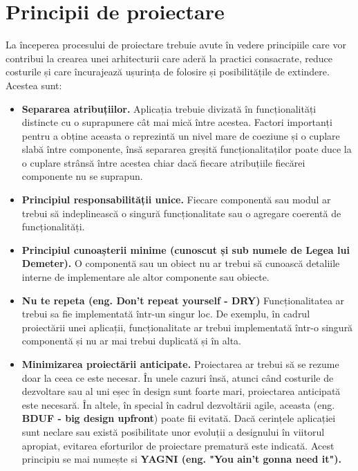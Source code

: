 \documentclass[12pt, a4paper, oneside, romanian]{teza-upb}
\begin{document}
\section{Principii de proiectare}
La începerea procesului de proiectare trebuie avute în vedere principiile care vor contribui la crearea unei arhitecturii care aderă la practici consacrate, reduce costurile și care încurajează ușurința de folosire și posibilitățile de extindere. Acestea sunt:
\begin{itemize}
\item \textbf{Separarea atribuțiilor.} Aplicația trebuie divizată în funcționalități distincte cu o suprapunere cât mai mică între acestea. Factori importanți pentru a obține aceasta o reprezintă un nivel mare de coeziune și o cuplare slabă între componente, însă separarea greșită funcționalitaților poate duce la o cuplare strânsă între acestea chiar dacă fiecare atribuțiile fiecărei componente nu se suprapun.

\item \textbf{Principiul responsabilității unice.} Fiecare componentă sau modul ar trebui să indeplinească o singură funcționalitate sau o agregare coerentă de funcționalități. 

\item \textbf{Principiul cunoașterii minime (cunoscut și sub numele de Legea lui Demeter).} O componentă sau un obiect nu ar trebui să cunoască detaliile interne de implementare ale altor componente sau obiecte.

\item \textbf{Nu te repeta (eng. Don't repeat yourself - DRY)}
Funcționalitatea ar trebui sa fie implementată într-un singur loc. De exemplu, în cadrul proiectării unei aplicații, funcționalitate ar trebui implementată într-o singură componentă și nu ar mai trebui duplicată și în alta.

\item \textbf{Minimizarea proiectării anticipate.} Proiectarea ar trebui să se rezume doar la ceea ce este necesar. În unele cazuri însă, atunci când costurile de dezvoltare sau al uni eșec în design sunt foarte mari, proiectarea anticipată este necesară. În altele, în special în cadrul dezvoltării agile, aceasta (eng. \textbf{BDUF - big design upfront}) poate fii evitată. Dacă cerințele aplicației sunt neclare sau există posibilitate unor evoluții a designului în viitorul apropiat, evitarea eforturilor de proiectare prematură este indicată. Acest principiu se mai numește si \textbf{YAGNI (eng. "You ain’t gonna need it").}
\end{itemize}
\end{document}
